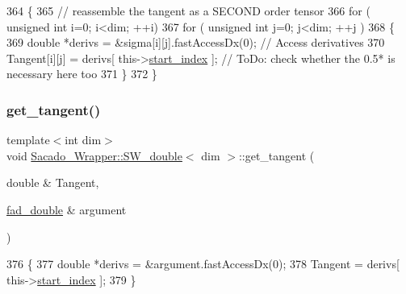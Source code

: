 \begin{DoxyCode}
364     \{
365         \textcolor{comment}{// reassemble the tangent as a SECOND order tensor}
366          \textcolor{keywordflow}{for} ( \textcolor{keywordtype}{unsigned} \textcolor{keywordtype}{int} i=0; i<dim; ++i)
367             \textcolor{keywordflow}{for} ( \textcolor{keywordtype}{unsigned} \textcolor{keywordtype}{int} j=0; j<dim; ++j )
368             \{
369                 \textcolor{keywordtype}{double} *derivs = &sigma[i][j].fastAccessDx(0); \textcolor{comment}{// Access derivatives}
370                 Tangent[i][j] = derivs[ this->\hyperlink{classSacado__Wrapper_1_1SW__double_aa0927ce06528899dd44afe5d770840c1}{start\_index} ]; \textcolor{comment}{// ToDo: check whether the 0.5* is
       necessary here too}
371             \}
372     \}
\end{DoxyCode}
\mbox{\label{classSacado__Wrapper_1_1SW__double_a468303caab70c91f72bfe0547afff53a}} 
\subsubsection{\texorpdfstring{get\+\_\+tangent()}{get\_tangent()}\hspace{0.1cm}{\footnotesize\ttfamily [2/2]}}
{\footnotesize\ttfamily template$<$int dim$>$ \\
void \hyperlink{classSacado__Wrapper_1_1SW__double}{Sacado\+\_\+\+Wrapper\+::\+S\+W\+\_\+double}$<$ dim $>$\+::get\+\_\+tangent (\begin{DoxyParamCaption}\item[{double \&}]{Tangent,  }\item[{\hyperlink{Sacado-auxiliary__functions_8h_a868b94676739e612d9c95940e70892a9}{fad\+\_\+double} \&}]{argument }\end{DoxyParamCaption})}


\begin{DoxyCode}
376     \{
377          \textcolor{keywordtype}{double} *derivs = &argument.fastAccessDx(0);
378          Tangent = derivs[ this->\hyperlink{classSacado__Wrapper_1_1SW__double_aa0927ce06528899dd44afe5d770840c1}{start\_index} ];
379     \}
\end{DoxyCode}
\mbox{\label{classSacado__Wrapper_1_1SW__double_ae7e9f33604ea736e485576447d78a46c}} 
